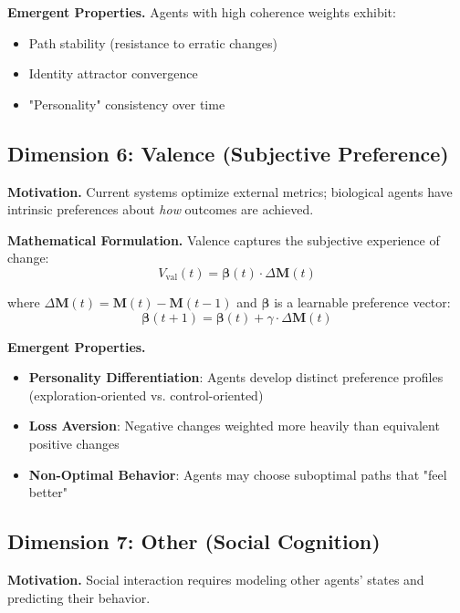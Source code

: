 \documentclass{article}
\begin{document}
\textbf{Emergent Properties.}
Agents with high coherence weights exhibit:
\begin{itemize}
    \item Path stability (resistance to erratic changes)
    \item Identity attractor convergence
    \item "Personality" consistency over time
\end{itemize}

\subsection{Dimension 6: Valence (Subjective Preference)}

\textbf{Motivation.} Current systems optimize external metrics; biological agents have intrinsic preferences about \textit{how} outcomes are achieved.

\textbf{Mathematical Formulation.}
Valence captures the subjective experience of change:
\begin{equation}
    V_{\text{val}}(t) = \boldsymbol{\beta}(t) \cdot \Delta\mathbf{M}(t)
\end{equation}

where $\Delta\mathbf{M}(t) = \mathbf{M}(t) - \mathbf{M}(t-1)$ and $\boldsymbol{\beta}$ is a learnable preference vector:
\begin{equation}
    \boldsymbol{\beta}(t+1) = \boldsymbol{\beta}(t) + \gamma \cdot \Delta\mathbf{M}(t)
\end{equation}

\textbf{Emergent Properties.}
\begin{itemize}
    \item \textbf{Personality Differentiation}: Agents develop distinct preference profiles (exploration-oriented vs. control-oriented)
    \item \textbf{Loss Aversion}: Negative changes weighted more heavily than equivalent positive changes
    \item \textbf{Non-Optimal Behavior}: Agents may choose suboptimal paths that "feel better"
\end{itemize}

\subsection{Dimension 7: Other (Social Cognition)}

\textbf{Motivation.} Social interaction requires modeling other agents' states and predicting their behavior.
\end{document}
